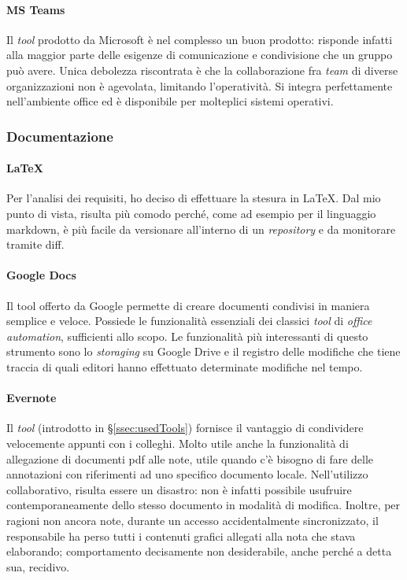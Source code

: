 \paragraph{MS Teams}
Il \textit{tool} prodotto da Microsoft è nel complesso un buon prodotto: risponde infatti alla maggior parte delle esigenze di comunicazione e condivisione che un gruppo può avere. Unica debolezza riscontrata è che la collaborazione fra \textit{team} di diverse organizzazioni non è agevolata, limitando l'operatività.
Si integra perfettamente nell'ambiente \gls{office} ed è disponibile per molteplici sistemi operativi.
\subsubsection{Documentazione}
\paragraph{\LaTeX}
Per l'analisi dei requisiti, ho deciso di effettuare la stesura in \LaTeX.
Dal mio punto di vista, risulta più comodo perché, come ad esempio per il linguaggio \gls{markdown}\glsfirstoccur, è più facile da versionare all'interno di un \textit{repository} e da monitorare tramite \gls{diff}\glsfirstoccur.
\paragraph{Google Docs}
Il tool offerto da Google permette di creare documenti condivisi in maniera semplice e veloce. Possiede le funzionalità essenziali dei classici \textit{tool} di \textit{office automation}, sufficienti allo scopo. Le funzionalità più interessanti di questo strumento sono lo \textit{storaging} su Google Drive e il registro delle modifiche che tiene traccia di quali editori hanno effettuato determinate modifiche nel tempo.
\paragraph{Evernote}
Il \textit{tool} (introdotto in \S\ref{ssec:usedTools}) fornisce il vantaggio di condividere velocemente appunti con i colleghi. Molto utile anche la funzionalità di allegazione di documenti pdf alle note, utile quando c'è bisogno di fare delle annotazioni con riferimenti ad uno specifico documento locale. Nell'utilizzo collaborativo, risulta essere un disastro: non è infatti possibile usufruire contemporaneamente dello stesso documento in modalità di modifica. Inoltre, per ragioni non ancora note, durante un accesso accidentalmente sincronizzato, il responsabile ha perso tutti i contenuti grafici allegati alla nota che stava elaborando; comportamento decisamente non desiderabile, anche perché a detta sua, recidivo.

